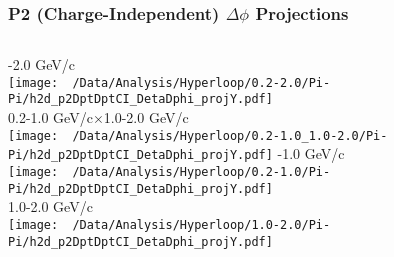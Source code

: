 \documentclass{beamer}
\begin{document}
\begin{frame}
	\frametitle{P2 (Charge-Independent) $\Delta\phi$ Projections}
	\begin{columns}
		-2.0 GeV/c\\
		\texttt{[image: ~/Data/Analysis/Hyperloop/0.2-2.0/Pi-Pi/h2d\_p2DptDptCI\_DetaDphi\_projY.pdf]}\\0.2-1.0 GeV/c$\times$1.0-2.0 GeV/c\\
		\texttt{[image: ~/Data/Analysis/Hyperloop/0.2-1.0\_1.0-2.0/Pi-Pi/h2d\_p2DptDptCI\_DetaDphi\_projY.pdf]}
		-1.0 GeV/c\\
		\texttt{[image: ~/Data/Analysis/Hyperloop/0.2-1.0/Pi-Pi/h2d\_p2DptDptCI\_DetaDphi\_projY.pdf]}\\1.0-2.0 GeV/c\\
		\texttt{[image: ~/Data/Analysis/Hyperloop/1.0-2.0/Pi-Pi/h2d\_p2DptDptCI\_DetaDphi\_projY.pdf]}
	\end{columns}
\end{frame}
\end{document}

